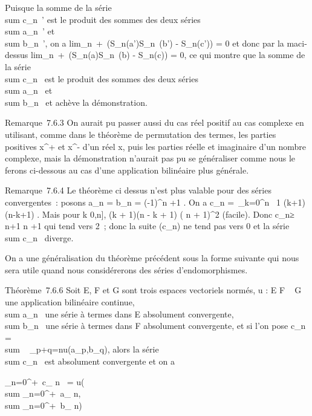 \documentclass[]{article}
\begin{document}
Puisque la somme de la série
\\sum  c\_n~' est
le produit des sommes des deux séries
\\sum  a\_n~' et
\\sum  b\_n~', on
a
lim\_n\rightarrow~+\infty~(S\_n(a')S\_n~(b')
- S\_n(c')) = 0 et donc par la ma\jmathoration ci-dessus
lim\_n\rightarrow~+\infty~(S\_n(a)S\_n~(b)
- S\_n(c)) = 0, ce qui montre que la somme de la série
\\sum  c\_n~ est
le produit des sommes des deux séries
\\sum  a\_n~ et
\\sum  b\_n~ et
achève la démonstration.

Remarque~7.6.3 On aurait pu passer aussi du cas réel positif au cas
complexe en utilisant, comme dans le théorème de permutation des termes,
les parties positives x^+ et x^- d'un réel x, puis
les parties réelle et imaginaire d'un nombre complexe, mais la
démonstration n'aurait pas pu se généraliser comme nous le ferons
ci-dessous au cas d'une application bilinéaire plus générale.

Remarque~7.6.4 Le théorème ci dessus n'est plus valable pour des séries
convergentes~: posons a\_n = b\_n = (-1)^n
\over \sqrtn+1 . On a
\textbar{}c\_n\textbar{} =\
\sum  \_k=0^n~ 1
\over \sqrt(k+1)(n-k+1) . Mais pour
k \in {[}0,n{]}, (k + 1)(n - k + 1) \leq ( n  +
1)^2 (facile). Donc \textbar{}c\_n\textbar{}≥ n+1
\over  n \over 2 +1 qui tend vers
2~; donc la suite (c\_n) ne tend pas vers 0 et la série
\\sum  c\_n~
diverge.

On a une généralisation du théorème précédent sous la forme suivante qui
nous sera utile quand nous considérerons des séries d'endomorphismes.

Théorème~7.6.6 Soit E, F et G sont trois espaces vectoriels normés, u :
E \times F \rightarrow~ G une application bilinéaire continue,
\\sum  a\_n~ une
série à termes dans E absolument convergente,
\\sum  b\_n~ une
série à termes dans F absolument convergente, et si l'on pose
c\_n = \\sum ~
\_p+q=nu(a\_p,b\_q), alors la série
\\sum  c\_n~ est
absolument convergente et on a

\sum \_n=0^+\infty~c\_ n~ =
u\left (\\sum
\_n=0^+\infty~a\_ n,\\sum
\_n=0^+\infty~b\_ n\right )
\end{document}
